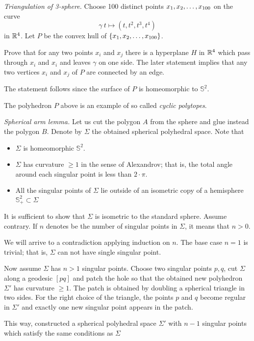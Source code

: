 \textit{Triangulation of 3-sphere.}
Choose 100 distinct points $x_1,x_2,\z\dots,x_{100}$
on the curve 
\[\gamma\:t\mapsto (t,t^2,t^3,t^4)\] 
in $\mathbb{R}^4$.
Let $P$ be the convex hull of $\{x_1,x_2,\z\dots,x_{100}\}$.

Prove that for any two points $x_i$ and $x_j$ there is a hyperplane $H$ in $\mathbb{R}^4$ which pass through $x_i$ and $x_i$ and leaves $\gamma$ on one side.
The later statement implies that any two vertices $x_i$ and $x_j$
of $P$ are connected by an edge.

The statement follows
since the surface of $P$ is homeomorphic to $\mathbb{S}^2$.

The polyhedron $P$ above is an example 
of so called \emph{cyclic polytopes}.

\textit{Spherical arm lemma.}
Let us cut the polygon $A$ from the sphere and glue instead the polygon $B$.
Denote by $\Sigma$ the obtained spherical polyhedral space.
Note that 
\begin{itemize}
\item $\Sigma$ is homeomorphic $\mathbb S^2$.
\item $\Sigma$ has curvature $\ge 1$ in the sense of Alexandrov; that is, the total angle around each singular point is less than $2\cdot \pi$.
\item All the singular points of $\Sigma$ 
lie outside of an isometric copy of a hemisphere $\mathbb{S}^2_+\subset \Sigma$
\end{itemize}

It is sufficient to show that $\Sigma$ is isometric to the standard sphere.
Assume contrary.
If $n$ denotes be the number of singular points in $\Sigma$, 
it means that $n>0$.

We will arrive to a contradiction applying induction on $n$.
The base case $n=1$ is trivial; 
that is, $\Sigma$ can not have single singular point.

Now assume $\Sigma$ has $n>1$ singular points.
Choose two singular points $p, q$,
cut $\Sigma$ along a geodesic $[pq]$
and patch the hole so that the obtained new polyhedron $\Sigma'$ has curvature $\ge 1$.
The patch is obtained by doubling a
spherical triangle in two sides.
For the right choice of the triangle,
the points $p$ and $q$ become regular in $\Sigma'$
and exactly one new singular point appears in the patch.

This way, constructed a  spherical polyhedral space $\Sigma'$
with $n-1$ singular points which satisfy the same conditions as $\Sigma$ 

